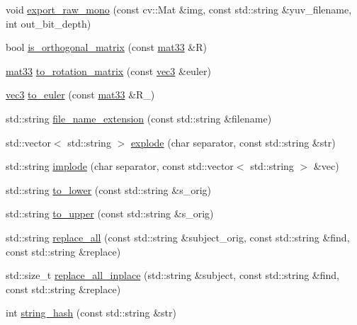 \begin{DoxyCompactItemize}
\item 
void \hyperlink{namespacetlz_abe3f12fe91d69fddc9db8e838da1af11}{export\+\_\+raw\+\_\+mono} (const cv\+::\+Mat \&img, const std\+::string \&yuv\+\_\+filename, int out\+\_\+bit\+\_\+depth)
\item 
bool \hyperlink{namespacetlz_a6eb3653f0e3dd7efcb6a620f9643492a}{is\+\_\+orthogonal\+\_\+matrix} (const \hyperlink{namespacetlz_a6679497d5121f319147594e1f344ef57}{mat33} \&R)
\item 
\hyperlink{namespacetlz_a6679497d5121f319147594e1f344ef57}{mat33} \hyperlink{namespacetlz_aa97786c6fc9e60663efcaa490eb3181f}{to\+\_\+rotation\+\_\+matrix} (const \hyperlink{namespacetlz_ad0646d752ddb9d40d702d40cc6dc54a1}{vec3} \&euler)
\item 
\hyperlink{namespacetlz_ad0646d752ddb9d40d702d40cc6dc54a1}{vec3} \hyperlink{namespacetlz_ad15709c59127deda12dbfd6bc4518a07}{to\+\_\+euler} (const \hyperlink{namespacetlz_a6679497d5121f319147594e1f344ef57}{mat33} \&R\+\_\+)
\item 
std\+::string \hyperlink{namespacetlz_ae11c827ac9e581f9d2f98c39aab3750d}{file\+\_\+name\+\_\+extension} (const std\+::string \&filename)
\item 
std\+::vector$<$ std\+::string $>$ \hyperlink{namespacetlz_a61f6a6d670ff102367298c39a1a3b0b4}{explode} (char separator, const std\+::string \&str)
\item 
std\+::string \hyperlink{namespacetlz_ab71086dd7f55579412df3bfecb2d0f53}{implode} (char separator, const std\+::vector$<$ std\+::string $>$ \&vec)
\item 
std\+::string \hyperlink{namespacetlz_a6745ce98447ef5d811fb6e80dbf5d468}{to\+\_\+lower} (const std\+::string \&s\+\_\+orig)
\item 
std\+::string \hyperlink{namespacetlz_a5bf364598fd30694e822107c0a265858}{to\+\_\+upper} (const std\+::string \&s\+\_\+orig)
\item 
std\+::string \hyperlink{namespacetlz_a02e2eaeb0698664d5ef0f1bbb7f0562c}{replace\+\_\+all} (const std\+::string \&subject\+\_\+orig, const std\+::string \&find, const std\+::string \&replace)
\item 
std\+::size\+\_\+t \hyperlink{namespacetlz_aa873e2e01e016be89be037ee4a677b40}{replace\+\_\+all\+\_\+inplace} (std\+::string \&subject, const std\+::string \&find, const std\+::string \&replace)
\item 
int \hyperlink{namespacetlz_ae5932564ec9a5798fa5dbfdd1ed411a1}{string\+\_\+hash} (const std\+::string \&str)
\item 

\end{DoxyCompactItemize}
